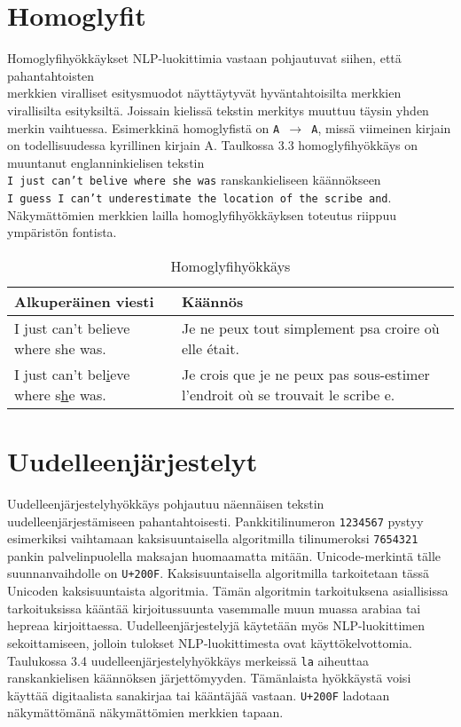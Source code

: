 \section{Homoglyfit}
Homoglyfihyökkäykset NLP-luokittimia vastaan pohjautuvat siihen, että pahantahtoisten\\ merkkien viralliset esitysmuodot näyttäytyvät hyväntahtoisilta merkkien virallisilta esityksiltä. Jois\-sain kielissä tekstin merkitys muuttuu täysin yhden merkin vaihtuessa. Esimerkkinä homoglyfistä on \texttt{A $\rightarrow$ A}, missä viimeinen kirjain on todellisuudessa kyrillinen kirjain A. Taulkossa 3.3 homoglyfihyökkäys on muuntanut englanninkielisen tekstin\\ \texttt{I just can't belive where she was} ranskankieliseen käännökseen\\ \texttt{I guess I can't underestimate the location of the scribe and}.\\
Näkymättömien merkkien lailla homoglyfihyökkäyksen toteutus riippuu ympäristön fontista. \citep{boucher2021bad}

\begin{table}[hbt]
  \begin{tabular}{| l | m{20em} |}
    \hline
    Alkuperäinen viesti & Käännös\\
    \hline
    I just can't believe where she was. & Je ne peux tout simplement psa croire où elle était.\\
    \hline
    I \underline{j}ust can't bel\underline{i}eve where s\underline{h}e was. & Je crois que je ne peux pas sous-estimer l'endroit où se trouvait le scribe e.\\
    \hline
  \end{tabular}
  \caption{Homoglyfihyökkäys \citep{boucher2021bad}}
\end{table}

\section{Uudelleenjärjestelyt}
Uudelleenjärjestelyhyökkäys pohjautuu näennäisen tekstin uudelleenjärjestämiseen pahantahtoisesti. Pankkitilinumeron \texttt{1234567} pystyy esimerkiksi vaihtamaan kaksisuuntaisella algoritmilla tilinumeroksi \texttt{7654321} pankin palvelinpuolella maksajan huomaamatta mitään. Unicode-merkintä tälle suunnanvaihdolle on \texttt{U+200F}. Kaksisuuntaisella algoritmilla tarkoitetaan tässä Unicoden kaksisuuntaista algoritmia. Tämän algoritmin tarkoituksena asiallisissa tarkoituksissa kääntää kirjoitussuunta vasemmalle muun muassa arabiaa tai hepreaa kirjoittaessa. Uudelleenjärjestelyjä käytetään myös NLP-luokittimen sekoittamiseen, jolloin tulokset NLP-luokittimesta ovat käyttökelvottomia. Taulukossa 3.4 uudelleenjärjestelyhyökkäys merkeissä \texttt{la} aiheuttaa ranskankielisen käännöksen järjettömyyden. Tämänlaista hyökkäystä voisi käyttää digitaalista sanakirjaa tai kääntäjää vastaan. \citep{boucher2021bad} \texttt{U+200F} ladotaan näkymättömänä näkymättömien merkkien tapaan.

